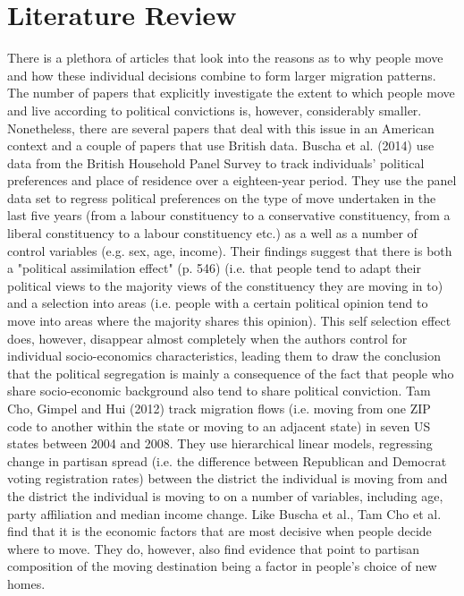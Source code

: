 \documentclass[12pt, a4paper]{article}
\begin{document}
\section{Literature Review}\label{lit}
There is a plethora of articles that look into the reasons as to why people move and how these individual decisions combine to form larger migration patterns. The number of papers that explicitly investigate the extent to which people move and live according to political convictions is, however, considerably smaller. Nonetheless, there are several papers that deal with this issue in an American context and a couple of papers that use British data. 
\newline Buscha et al. (2014) use data from the British Household Panel Survey to track individuals' political preferences and place of residence over a eighteen-year period. They use the panel data set to regress political preferences on the type of move undertaken in the last five years (from a labour constituency to a conservative constituency, from a liberal constituency to a labour constituency etc.) as a well as a number of control variables (e.g. sex, age, income). Their findings suggest that there is both a "political assimilation effect" (p. 546) (i.e. that people tend to adapt their political views to the majority views of the constituency they are moving in to) and a selection into areas (i.e. people with a certain political opinion tend to move into areas where the majority shares this opinion). This self selection effect does, however, disappear almost completely when the authors control for individual socio-economics characteristics, leading them to draw the conclusion that the political segregation is mainly a consequence of the fact that people who share socio-economic background also tend to share  political conviction.   
\newline Tam Cho, Gimpel and Hui (2012) track migration flows (i.e. moving from one ZIP code to another within the state or moving to an adjacent state) in seven US states between 2004 and 2008. They use hierarchical linear models, regressing change in partisan spread (i.e. the difference between Republican and Democrat voting registration rates) between the district the individual is moving from and the district the individual is moving to on a number of variables, including age, party affiliation and median income change. Like Buscha et al., Tam Cho et al. find that it is the economic factors that are most decisive when people decide where to move. They do, however, also find evidence that point to partisan composition of the moving destination being a factor in people's choice of new homes. 
\end{document}
